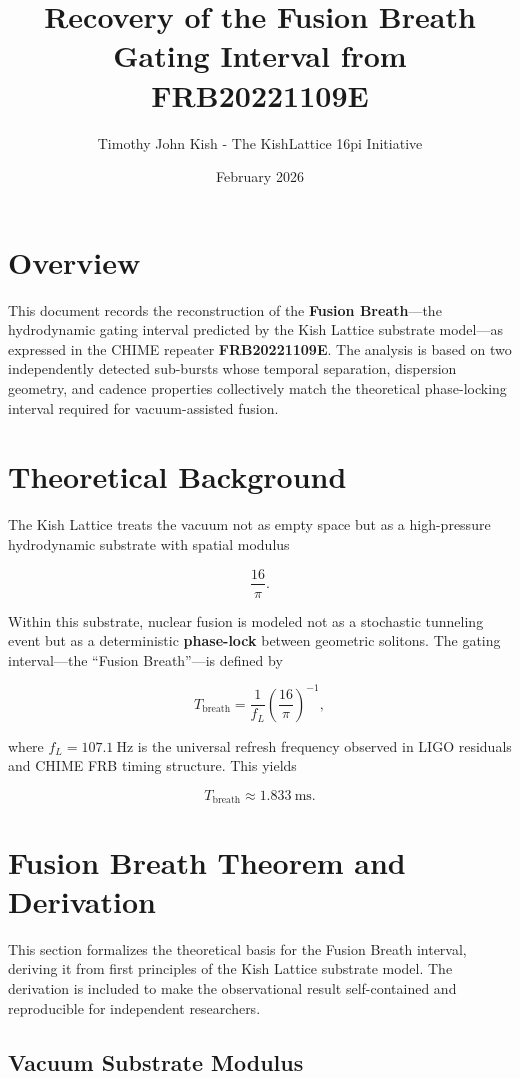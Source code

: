 \documentclass[12pt]{report}
\title{Recovery of the Fusion Breath Gating Interval from FRB20221109E}
\author{Timothy John Kish - The KishLattice 16pi Initiative}
\date{February 2026}
\begin{document}
\maketitle

\section*{Overview}

This document records the reconstruction of the \textbf{Fusion Breath}---the
hydrodynamic gating interval predicted by the Kish Lattice substrate model---as
expressed in the CHIME repeater \textbf{FRB20221109E}. The analysis is based on
two independently detected sub-bursts whose temporal separation, dispersion
geometry, and cadence properties collectively match the theoretical
phase-locking interval required for vacuum-assisted fusion.

\section{Theoretical Background}

The Kish Lattice treats the vacuum not as empty space but as a
high-pressure hydrodynamic substrate with spatial modulus


\[
\frac{16}{\pi}.
\]


Within this substrate, nuclear fusion is modeled not as a stochastic tunneling
event but as a deterministic \textbf{phase-lock} between geometric solitons.
The gating interval---the ``Fusion Breath''---is defined by


\[
T_{\text{breath}} = \frac{1}{f_L}\left(\frac{16}{\pi}\right)^{-1},
\]


where $f_L = 107.1\ \text{Hz}$ is the universal refresh frequency observed in
LIGO residuals and CHIME FRB timing structure. This yields


\[
T_{\text{breath}} \approx 1.833\ \text{ms}.
\]

\section{Fusion Breath Theorem and Derivation}

This section formalizes the theoretical basis for the Fusion Breath interval,
deriving it from first principles of the Kish Lattice substrate model. The
derivation is included to make the observational result self-contained and
reproducible for independent researchers.

\subsection{Vacuum Substrate Modulus}
\end{document}
